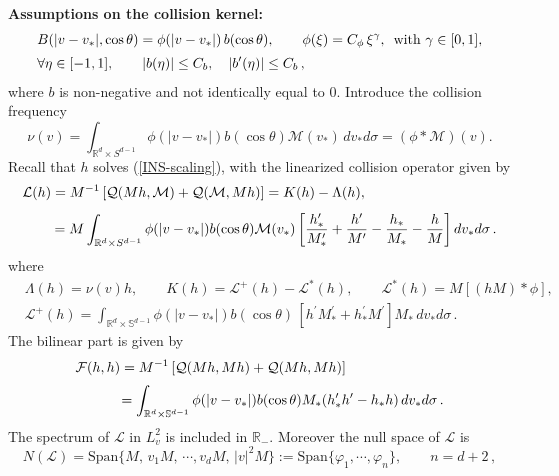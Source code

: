 \documentclass[final,onefignum,onetabnum]{siamart171218}
\begin{document}
{\bf Assumptions on the collision kernel:}
\begin{align}
&\displaystyle B(|v-v_{\ast}|, \cos\theta) = \phi(|v-v_{\ast}|)\, b(\cos\theta),  \qquad
\phi(\xi) = C_{\phi}\, \xi^{\gamma}, \, \text{  with      }\gamma\in[0,1], \notag\\[2pt]
&\label{BK}\displaystyle \forall\eta\in[-1,1], \qquad |b(\eta)|\leq C_b, \quad |b^{\prime}(\eta)|\leq C_b\,,
\end{align}
where $b$ is non-negative and not identically equal to $0$. Introduce the collision frequency
$$\nu(v) = \int_{\mathbb R^d\times S^{d-1}}\phi(|v-v_{\ast}|) b(\cos\theta) \mathcal M(v_{\ast})\, dv_{\ast}d\sigma
=(\phi \ast\mathcal M)(v). $$
Recall that $h$ solves (\ref{INS-scaling}),
with the linearized collision operator given by
\begin{align}
&\displaystyle\mathcal L(h)= M^{-1}\left[\mathcal Q(Mh,\mathcal M) + \mathcal Q(\mathcal M, Mh)\right] = K(h)-\Lambda(h), \notag\\[4pt]
&\label{L0}\displaystyle \qquad = M \int_{\mathbb R^d\times S^{d-1}}\phi(|v-v_{\ast}|)b(\cos\theta)\mathcal M(v_{\ast}) 
\left[\frac{h_{\ast}^{\prime}}{M_{\ast}^{\prime}}+\frac{h^{\prime}}{M^{\prime}}-\frac{h_{\ast}}{M_{\ast}}-\frac{h}{M}\right] dv_{\ast}d\sigma\,. 
\end{align}
where
\begin{align*}
&\displaystyle\Lambda(h)=\nu(v)h, \qquad K(h)=\mathcal L^{+}(h)-\mathcal L^{\ast}(h), \qquad
\mathcal L^{\ast}(h)=M [(hM)\ast\phi], \\[2pt]
&\displaystyle \mathcal L^{+}(h)=\int_{\mathbb R^d\times\mathbb S^{d-1}}\phi(|v-v_{\ast}|) b(\cos\theta)\, [h^{\prime}M_{\ast}^{\prime}+
h_{\ast}^{\prime}M^{\prime}] M_{\ast}\, dv_{\ast}d\sigma\,.
\end{align*}
The bilinear part is given by
\begin{align}
&\displaystyle\mathcal F(h,h)=M^{-1}\left[\mathcal Q(Mh,Mh)+\mathcal Q(Mh,Mh)\right] \notag\\[2pt]
&\displaystyle\label{GB}\qquad\quad =\int_{\mathbb R^d\times\mathbb S^{d-1}}\phi(|v-v_{\ast}|)b(\cos\theta)
M_{\ast}(h_{\ast}^{\prime}h^{\prime}-h_{\ast}h)\, dv_{\ast}d\sigma\,.
\end{align}
The spectrum of $\mathcal L$ in $L_v^2$ is included in $\mathbb R_{-}$. Moreover the null space of $\mathcal L$ is
\begin{equation}\label{NB} N(\mathcal L)=\text{Span}\{M, \,v_1 M, \,\cdots, v_d M, \, |v|^2 M\}:=\text{Span}\{\varphi_1, \cdots, \varphi_n\}, \qquad
n=d+2\,,\end{equation}
\end{document}
